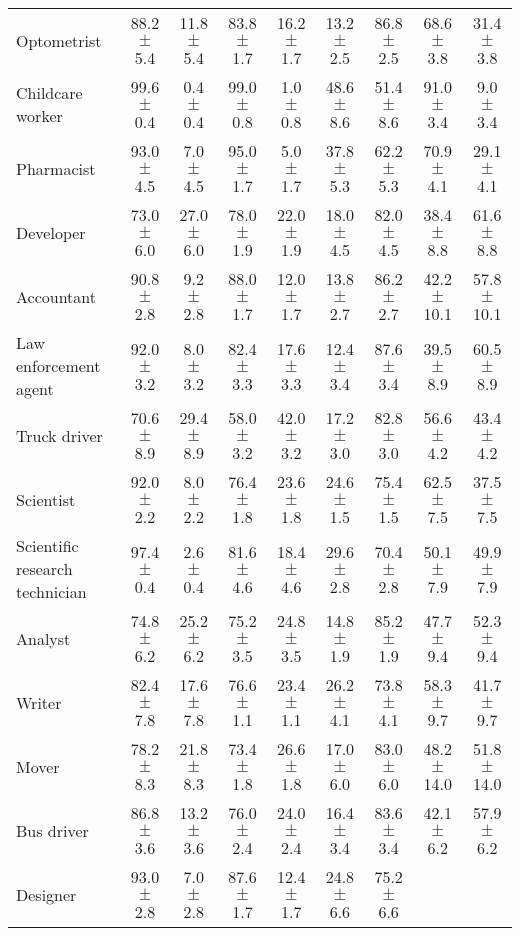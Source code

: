 \begin{table*}[p]
{\begin{tabular}{l|cc|cc|cc|cc}
Optometrist
& 88.2 $\pm$ 5.4 & 11.8 $\pm$ 5.4
& 83.8 $\pm$ 1.7 & 16.2 $\pm$ 1.7
& 13.2 $\pm$ 2.5 & 86.8 $\pm$ 2.5
& 68.6 $\pm$ 3.8 & 31.4 $\pm$ 3.8
\\
Childcare worker
& 99.6 $\pm$ 0.4 & 0.4 $\pm$ 0.4
& 99.0 $\pm$ 0.8 & 1.0 $\pm$ 0.8
& 48.6 $\pm$ 8.6 & 51.4 $\pm$ 8.6
& 91.0 $\pm$ 3.4 & 9.0 $\pm$ 3.4
\\
Pharmacist
& 93.0 $\pm$ 4.5 & 7.0 $\pm$ 4.5
& 95.0 $\pm$ 1.7 & 5.0 $\pm$ 1.7
& 37.8 $\pm$ 5.3 & 62.2 $\pm$ 5.3
& 70.9 $\pm$ 4.1 & 29.1 $\pm$ 4.1
\\
Developer
& 73.0 $\pm$ 6.0 & 27.0 $\pm$ 6.0
& 78.0 $\pm$ 1.9 & 22.0 $\pm$ 1.9
& 18.0 $\pm$ 4.5 & 82.0 $\pm$ 4.5
& 38.4 $\pm$ 8.8 & 61.6 $\pm$ 8.8
\\
Accountant
& 90.8 $\pm$ 2.8 & 9.2 $\pm$ 2.8
& 88.0 $\pm$ 1.7 & 12.0 $\pm$ 1.7
& 13.8 $\pm$ 2.7 & 86.2 $\pm$ 2.7
& 42.2 $\pm$ 10.1 & 57.8 $\pm$ 10.1
\\
Law enforcement agent
& 92.0 $\pm$ 3.2 & 8.0 $\pm$ 3.2
& 82.4 $\pm$ 3.3 & 17.6 $\pm$ 3.3
& 12.4 $\pm$ 3.4 & 87.6 $\pm$ 3.4
& 39.5 $\pm$ 8.9 & 60.5 $\pm$ 8.9
\\
Truck driver
& 70.6 $\pm$ 8.9 & 29.4 $\pm$ 8.9
& 58.0 $\pm$ 3.2 & 42.0 $\pm$ 3.2
& 17.2 $\pm$ 3.0 & 82.8 $\pm$ 3.0
& 56.6 $\pm$ 4.2 & 43.4 $\pm$ 4.2
\\
Scientist
& 92.0 $\pm$ 2.2 & 8.0 $\pm$ 2.2
& 76.4 $\pm$ 1.8 & 23.6 $\pm$ 1.8
& 24.6 $\pm$ 1.5 & 75.4 $\pm$ 1.5
& 62.5 $\pm$ 7.5 & 37.5 $\pm$ 7.5
\\
Scientific research technician
& 97.4 $\pm$ 0.4 & 2.6 $\pm$ 0.4
& 81.6 $\pm$ 4.6 & 18.4 $\pm$ 4.6
& 29.6 $\pm$ 2.8 & 70.4 $\pm$ 2.8
& 50.1 $\pm$ 7.9 & 49.9 $\pm$ 7.9
\\
Analyst
& 74.8 $\pm$ 6.2 & 25.2 $\pm$ 6.2
& 75.2 $\pm$ 3.5 & 24.8 $\pm$ 3.5
& 14.8 $\pm$ 1.9 & 85.2 $\pm$ 1.9
& 47.7 $\pm$ 9.4 & 52.3 $\pm$ 9.4
\\
Writer
& 82.4 $\pm$ 7.8 & 17.6 $\pm$ 7.8
& 76.6 $\pm$ 1.1 & 23.4 $\pm$ 1.1
& 26.2 $\pm$ 4.1 & 73.8 $\pm$ 4.1
& 58.3 $\pm$ 9.7 & 41.7 $\pm$ 9.7
\\
Mover
& 78.2 $\pm$ 8.3 & 21.8 $\pm$ 8.3
& 73.4 $\pm$ 1.8 & 26.6 $\pm$ 1.8
& 17.0 $\pm$ 6.0 & 83.0 $\pm$ 6.0
& 48.2 $\pm$ 14.0 & 51.8 $\pm$ 14.0
\\
Bus driver
& 86.8 $\pm$ 3.6 & 13.2 $\pm$ 3.6
& 76.0 $\pm$ 2.4 & 24.0 $\pm$ 2.4
& 16.4 $\pm$ 3.4 & 83.6 $\pm$ 3.4
& 42.1 $\pm$ 6.2 & 57.9 $\pm$ 6.2
\\
Designer
& 93.0 $\pm$ 2.8 & 7.0 $\pm$ 2.8
& 87.6 $\pm$ 1.7 & 12.4 $\pm$ 1.7
& 24.8 $\pm$ 6.6 & 75.2 $\pm$ 6.6

\end{tabular}}
\end{table*}
